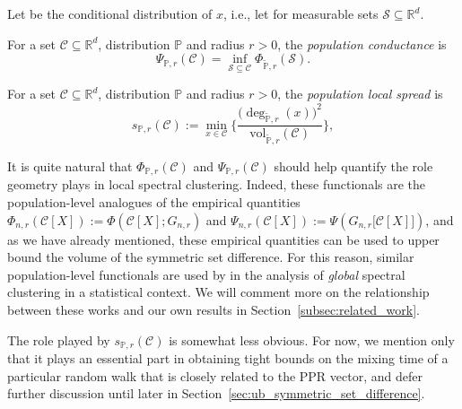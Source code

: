 \documentclass[twoside,11pt]{article}
\newcommand{\Reals}{\mathbb{R}}
\newcommand{\1}{\mathbf{1}}
\newcommand{\Rd}{\Reals^d}
\newcommand{\mc}[1]{\mathcal{#1}}
\newcommand{\Pbb}{\mathbb{P}}
\newcommand{\wt}[1]{\widetilde{#1}}
\newcommand{\vol}{\mathrm{vol}}
\begin{document}
Let \smash{$\wt{\Pbb}(\cdot) = \Pbb(\cdot|x \in \mc{C})$} be the conditional distribution of $x$, i.e., let \smash{$\wt{\Pbb}(\mc{S}) = \wt{\Pbb}(\mc{S} \cap \mc{C})/\wt{\Pbb}(\mc{C})$} for measurable sets $\mc{S} \subseteq \Rd$.

\begin{definition}
	For a set $\mc{C} \subseteq \Rd$, distribution $\Pbb$ and radius $r > 0$, the \emph{population conductance} is
	\begin{equation}
	\label{eqn:population_conductance}
	\Psi_{\Pbb,r}(\mc{C}) = \inf_{\mc{S} \subseteq \mc{C}} \Phi_{\wt{\Pbb},r}(\mc{S}).
	\end{equation}
\end{definition}

\begin{definition}
	For a set $\mc{C} \subseteq \Rd$, distribution $\Pbb$ and radius $r > 0$, the \emph{population local spread} is
	\begin{equation}
	\label{eqn:local_spread}
	s_{\Pbb,r}(\mc{C}) := \min_{x \in \mc{C}} \biggl\{\frac{\bigl(\deg_{\wt{\Pbb},r}(x)\bigr)^2}{\vol_{\wt{\Pbb},r}(\mc{C})} \biggr\},
	\end{equation}
\end{definition}

It is quite natural that $\Phi_{\Pbb,r}(\mc{C})$ and $\Psi_{\Pbb,r}(\mc{C})$ should help quantify the role geometry plays in local spectral clustering. Indeed, these functionals are the population-level analogues of the empirical quantities $\Phi_{n,r}(\mc{C}[X]) := \Phi(\mc{C}[X];G_{n,r})$ and $\Psi_{n,r}(\mc{C}[X]) := \Psi(G_{n,r}\bigl[\mc{C}[X]\bigr])$, and as we have already mentioned, these empirical quantities can be used to upper bound the volume of the symmetric set difference. For this reason, similar population-level functionals are used by \cite{shi2009,schiebinger2015,garciatrillos19} in the analysis of \emph{global} spectral clustering in a statistical context. We will comment more on the relationship between these works and our own results in Section~\ref{subsec:related_work}. 

The role played by $s_{\Pbb,r}(\mc{C})$ is somewhat less obvious. For now, we mention only that it plays an essential part in obtaining tight bounds on the mixing time of a particular random walk that is closely related to the PPR vector, and defer further discussion until later in Section~\ref{sec:ub_symmetric_set_difference}.
\end{document}
